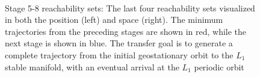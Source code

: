\begin{figure}[htbp]
    ~

    \caption{Stage 5-8 reachability sets: The last four reachability sets visualized in both the position (left) and \Poincare space (right).
        The minimum trajectories from the preceding stages are shown in red, while the next stage is shown in blue.
    The transfer goal is to generate a complete trajectory from the initial geostationary orbit to the \( L_1 \) stable manifold, with an eventual arrival at the \( L_1 \) periodic orbit~\label{fig:stage5to8_reachability}}
\end{figure}

